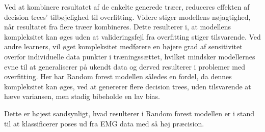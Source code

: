 
Ved at kombinere resultatet af de enkelte generede træer, reduceres effekten af decision trees' tilbøjelighed til overfitting. Videre stiger modellens nøjagtighed, når resultatet fra flere træer kombineres. Dette resulterer i, at modellens kompleksitet kan øges uden at valideringsfejl fra overfitting stiger tilsvarende. 
Ved andre learners, vil øget kompleksitet medførere en højere grad af sensitivitet overfor individuelle data punkter i træningssættet, hvilket mindsker modellernes evne til at generaliserer på ukendt data og derved resulterer i problemer med overfitting. Her har Random forest modellen således en fordel, da dennes kompleksitet kan øges, ved at genererer flere decision trees, uden tilsvarende at hæve variansen, men stadig bibeholde en lav bias. 

Dette er højest sandsynligt, hvad resulterer i Random forest modellen er i stand til at klassificerer poses ud fra EMG data med så høj præcision.   

